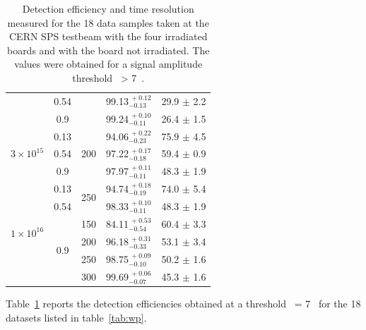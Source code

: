 \begin{table}[!htb]
\begin{tabular}{|c|c|c|c|c|}
			                                        & 0.54 &                        & 99.13$^{~\!+0.12}_{-0.13}$ & 29.9 $\pm$ 2.2\\ \cline{2-2} \cline{4-5}
			                                        & 0.9  &                        & 99.24$^{~\!+0.10}_{-0.11}$ & 26.4 $\pm$ 1.5\\ \cline{1-5} 
			\multirow{3}{*}{ $3 \times 10^{15}$ }   & 0.13 & \multirow{3}{*}{200}   & 94.06$^{~\!+0.22}_{-0.23}$ & 75.9 $\pm$ 4.5\\ \cline{2-2} \cline{4-5}
			                                        & 0.54 &                        & 97.22$^{~\!+0.17}_{-0.18}$ & 59.4 $\pm$ 0.9\\ \cline{2-2} \cline{4-5}
			                                        & 0.9  &                        & 97.97$^{~\!+0.11}_{-0.11}$ & 48.3 $\pm$ 1.9\\ \cline{1-5} 
			\multirow{6}{*}{ $1 \times 10^{16}$ }   & 0.13 & \multirow{2}{*}{250}   & 94.74$^{~\!+0.18}_{-0.19}$ & 74.0 $\pm$ 5.4\\ \cline{2-2} \cline{4-5}
			                                        & 0.54 &                        & 98.33$^{~\!+0.10}_{-0.11}$ & 48.3 $\pm$ 1.9\\ \cline{2-5}
			                    & \multirow{4}{*}{0.9}     & 150                    & 84.11$^{~\!+0.53}_{-0.54}$ & 60.4 $\pm$ 3.3\\ \cline{3-5} 
 			                                        &      & 200                    & 96.18$^{~\!+0.31}_{-0.33}$ & 53.1 $\pm$ 3.4\\ \cline{3-5}
                                        				&      & 250                    & 98.75$^{~\!+0.09}_{-0.10}$ & 50.2 $\pm$ 1.6\\ \cline{3-5}
                                       				&      & 300                    & 99.69$^{~\!+0.06}_{-0.07}$ & 45.3 $\pm$ 1.6\\ \cline{1-5}

			\end{tabular}
			\caption{Detection efficiency and time resolution measured for the 18 data samples taken at the CERN SPS testbeam with the four irradiated boards and with the board not irradiated. The values were obtained for a signal amplitude threshold \vth~> 7~\sigmav. }
			\label{tab:effres} 
		\end{table}

		Table~\ref{tab:effres} reports the detection efficiencies obtained at a threshold \vth~= 7 \sigmav~for the 18 datasets listed in table~\ref{tab:wp}.  


